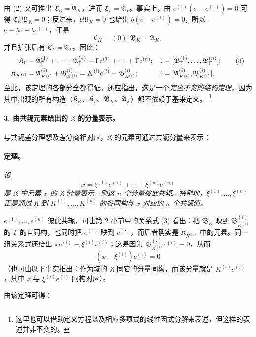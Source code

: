 \documentclass[11pt]{article}
\providecommand{\srcfn}[2]{%
  \begingroup
  \renewcommand{\thefootnote}{#1}%
  \footnote{#2}%
  \addtocounter{footnote}{-1}%
  \endgroup}
\begin{document}
由 (2) 又可推出 $\mathfrak C_K=\mathfrak A_K$，进而 $\mathfrak C_\Gamma=\mathfrak A_\Gamma$。事实上，由 $e^{(1)}(e-e^{(1)})=0$ 可得 $\mathfrak C_K\mathfrak B_K=0$；反过来，$b\mathfrak B_K=0$ 也给出 $b(e-e^{(1)})=0$，所以 $b=be=be^{(1)}$，于是
\[
\mathfrak C_K=(0):\mathfrak B_K=\mathfrak A_K,
\]
并且扩张后有 $\mathfrak C_\Gamma=\mathfrak A_\Gamma$。因此：
\begin{align}
\mathfrak K_\Gamma
&=\mathfrak A_\Gamma^{(1)}+\cdots+\mathfrak A_\Gamma^{(n)}
=\Gamma e^{(1)}+\cdots+\Gamma e^{(n)};
&0&=[\mathfrak B_\Gamma^{(1)},\ldots,\mathfrak B_\Gamma^{(n)}]; \tag{3}\\
\mathfrak K_{K^{(i)}}
&=\mathfrak A_{K^{(i)}}^{(i)}+\mathfrak B_{K^{(i)}}^{(i)}
=K^{(i)}e^{(i)}+\mathfrak B_{K^{(i)}}^{(i)};
&0&=[\mathfrak A_{K^{(i)}}^{(i)},\mathfrak B_{K^{(i)}}^{(i)}].\notag
\end{align}
至此，该定理的各部分全都得证。还应指出，这是一个\emph{完全不变的结构定理}，因为其中出现的所有构造（$\mathfrak K_K$、$\mathfrak K_\Gamma$、$\mathfrak B_K$、$\mathfrak A_K$）都不依赖于基来定义。\srcfn{18)}{这里也可以借助定义方程以及相应多项式的线性因式分解来表述，但这样的表述并非不变的。}

\paragraph{3. 由共轭元素给出的 $\mathfrak K$ 的分量表示。}
与共轭差分理想及差分商相对应，$\mathfrak K$ 的元素可通过共轭分量来表示：

\paragraph{定理。}
\emph{设
\[
x=\xi^{(1)}e^{(1)}+\cdots+\xi^{(n)}e^{(n)}
\]
是 $\mathfrak K$ 中元素 $x$ 的 $\mathfrak K$-分量表示，则这 $n$ 个分量彼此共轭。特别地，$\xi^{(1)},\ldots,\xi^{(n)}$ 正是通过 $\mathfrak K$ 到 $K^{(1)},\ldots,K^{(n)}$ 的各同构与 $x$ 对应的 $n$ 个共轭值。}

$e^{(1)},\ldots,e^{(n)}$ 彼此共轭，可由第 2 小节中的关系式 (3) 看出：把 $\mathfrak B_K$ 映到 $\mathfrak B_{K^{(i)}}^{(i)}$ 的 $\Gamma$ 的自同构，也同时把 $e^{(1)}$ 映到 $e^{(i)}$，而后者确实是 $\mathfrak K_{K^{(i)}}$ 中的元素。同一组关系式还给出 $xe^{(i)}=\xi^{(i)}e^{(i)}$；这是因为 $\mathfrak B_{K^{(i)}}^{(i)}e^{(i)}=0$，从而
\[
(x-\xi^{(i)})e^{(i)}=0
\]
（也可由以下事实推出：作为域的 $\mathfrak K$ 同它的分量同构，而该分量就是 $K^{(i)}e^{(i)}$，其中 $x$ 与 $\xi^{(i)}e^{(i)}$ 同构对应）。

由该定理可得：
\end{document}
